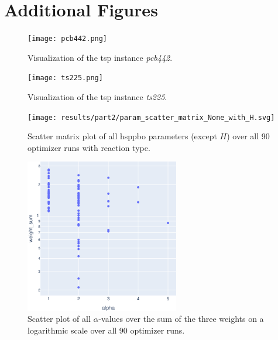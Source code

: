 \chapter{Additional Figures}
\label{chap:figures}

\begin{figure}[h]
	\centering
	\texttt{[image: pcb442.png]}
	\caption{Visualization of the \gls{tsp} instance \textit{pcb442}.}
	\label{fig:pcb442}
\end{figure}
\begin{figure}[h]
	\centering
	\texttt{[image: ts225.png]}
	\caption{Visualization of the \gls{tsp} instance \textit{ts225}.}
	\label{fig:ts225}
\end{figure}

\begin{figure}[h]
	\centering
	\texttt{[image: results/part2/param\_scatter\_matrix\_None\_with\_H.svg]}
	\caption[Scatter matrix plot of all \gls{hsppbo} parameters]{Scatter matrix plot of all \gls{hsppbo} parameters (except $H$) over all 90 optimizer runs with reaction type.}
	\label{fig:parameter_scatter_matrix_added}
\end{figure}
\begin{figure}[h]
	\centering
	\includegraphics[width=0.6\textwidth]{results/part2/alpha_weight_semilog_plot.svg}
	\caption[Scatter plot of all $\alpha$-values over the sum of the three weights]{Scatter plot of all $\alpha$-values over the sum of the three weights on a logarithmic scale over all 90 optimizer runs.}
	\label{fig:alpha_weight_semilog_plot}
\end{figure}

